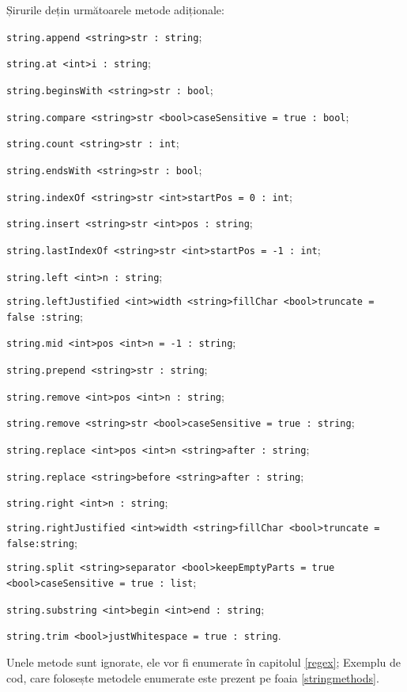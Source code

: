 Șirurile dețin următoarele metode adiționale:
\begin{icItems}
\item
	\lstinline|string.append <string>str : string|;
\item
	\lstinline|string.at <int>i : string|;
\item
	\lstinline|string.beginsWith <string>str : bool|;
\item
	\lstinline|string.compare <string>str <bool>caseSensitive = true : bool|;
\item
	\lstinline|string.count <string>str : int|;
\item
	\lstinline|string.endsWith <string>str : bool|;
\item
	\lstinline|string.indexOf <string>str <int>startPos = 0 : int|;
\item
	\lstinline|string.insert <string>str <int>pos : string|;
\item
	\lstinline|string.lastIndexOf <string>str <int>startPos = -1 : int|;
\item
	\lstinline|string.left <int>n : string|;
\item
	\lstinline|string.leftJustified <int>width <string>fillChar <bool>truncate = false :string|;
\item
	\lstinline|string.mid <int>pos <int>n = -1 : string|;
\item
	\lstinline|string.prepend <string>str : string|;
\item
	\lstinline|string.remove <int>pos <int>n : string|;
\item
	\lstinline|string.remove <string>str <bool>caseSensitive = true : string|;
\item
	\lstinline|string.replace <int>pos <int>n <string>after : string|;
\item
	\lstinline|string.replace <string>before <string>after : string|;
\item
	\lstinline|string.right <int>n : string|;
\item
	\lstinline|string.rightJustified <int>width <string>fillChar <bool>truncate = false:string|;
\item
	\lstinline|string.split <string>separator <bool>keepEmptyParts = true <bool>caseSensitive = true : list|;
\item
	\lstinline|string.substring <int>begin <int>end : string|;
\item
	\lstinline|string.trim <bool>justWhitespace = true : string|.
\end{icItems}

Unele metode sunt ignorate, ele vor fi enumerate în capitolul \ref{regex}; Exemplu de cod, care folosește metodele enumerate este prezent pe foaia \ref{stringmethods}.

